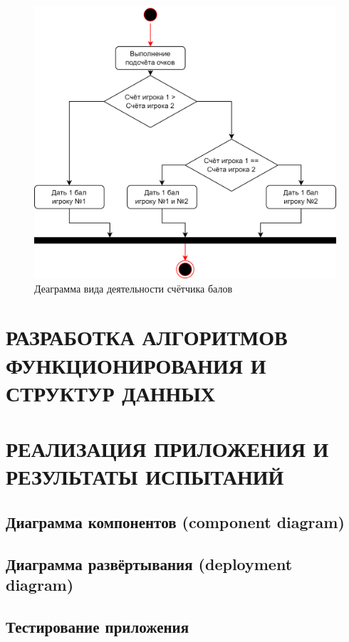 \documentclass[12pt, a4paper, simple]{eskdtext}
\begin{document}
    \begin{figure}[!h]
        \centering
        \includegraphics[]
            {../sources/game_architecture/build/game__activity_diagram.png}
        \caption{Деаграмма вида деятельности счётчика балов}
    \end{figure}

    \newpage
    
    \section{РАЗРАБОТКА АЛГОРИТМОВ ФУНКЦИОНИРОВАНИЯ И СТРУКТУР ДАННЫХ}
    \newpage
    
    \section{РЕАЛИЗАЦИЯ ПРИЛОЖЕНИЯ И РЕЗУЛЬТАТЫ ИСПЫТАНИЙ}
    \subsection{Диаграмма компонентов (component diagram)}
    \subsection{Диаграмма развёртывания (deployment diagram)}
    \subsection{Тестирование приложения}
    \newpage
\end{document}
